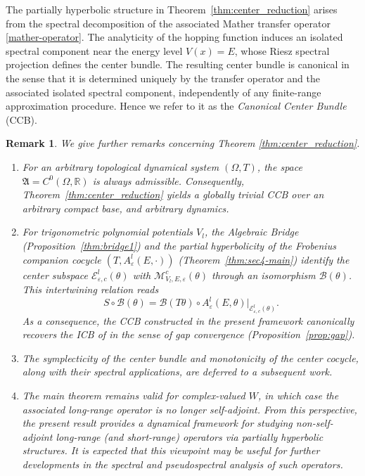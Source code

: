 \documentclass[reqno,11pt]{amsart}
\newtheorem{remark}{Remark}[section]
\begin{document}
The partially hyperbolic structure in Theorem~\ref{thm:center_reduction}
arises from the spectral decomposition of the associated
Mather transfer operator \eqref{mather-operator}. The analyticity of the hopping function
induces an isolated spectral component near the energy level
$V(x)=E$, whose Riesz spectral projection defines the center bundle.
The resulting center bundle is canonical in the sense that it is
determined uniquely by the transfer operator and the associated
isolated spectral component, independently of any finite-range
approximation procedure. Hence we refer to it as the
\emph{Canonical Center Bundle} (CCB).




\begin{remark}We give further remarks concerning Theorem \ref{thm:center_reduction}.
\begin{enumerate}
\item For an arbitrary topological dynamical system $(\Omega,T)$, the space
$\mathfrak A=C^0(\Omega,\mathbb R)$ is always admissible. Consequently,
Theorem~\ref{thm:center_reduction} yields a globally trivial CCB over an arbitrary compact base, and arbitrary dynamics. 
\item For trigonometric polynomial  potentials $V_l$, the Algebraic Bridge (Proposition~\ref{thm:bridge1}) and the partial hyperbolicity of the Frobenius companion cocycle $(T,A^l_\varepsilon(E,\cdot))$ (Theorem~\ref{thm:sec4-main}) identify the center subspace $\mathcal E^l_{\varepsilon,c}(\theta)$ with $\mathcal M^c_{V_l,E,\varepsilon}(\theta)$ through an isomorphism $\mathcal B(\theta)$. This intertwining relation reads
$$
 S \circ \mathcal B(\theta)=\mathcal B(T\theta)\circ A^l_\varepsilon(E,\theta)\big|_{\mathcal E^l_{\varepsilon,c}(\theta)}.
$$
As a consequence, the CCB constructed in the present framework canonically recovers the ICB of \cite{GJ} in the sense of gap convergence (Proposition~\ref{prop:gap}). 
\item The symplecticity of the center bundle and monotonicity \cite{AK2,LXZ,WXZ} of the center cocycle, along with their spectral applications, are deferred to a subsequent work. 
\item The main theorem remains valid for complex-valued $W$, in which case the associated long-range operator is no longer self-adjoint.  From this perspective, the present result provides a dynamical framework for studying non-self-adjoint long-range (and short-range) operators via  partially hyperbolic structures. It is expected that this viewpoint may be useful for further developments in the spectral and pseudospectral analysis of such operators.
\end{enumerate}
\end{remark}
\end{document}
